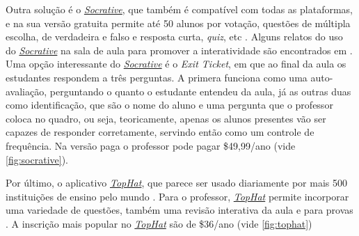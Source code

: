 Outra solução é o \href{http://www.socrative.com/}{\textit{Socrative}},
que também é compatível com todas as plataformas, e na sua versão gratuita
permite até 50 alunos por votação, questões de múltipla escolha, de verdadeira e falso e
resposta curta, \textit{quiz}, etc \cite{socrative2016}. Alguns relatos do uso do
\href{http://www.socrative.com/}{\textit{Socrative}} na sala de aula para promover
a interatividade são encontrados em \cite{Kaya2016, Trindade2014}.
Uma opção interessante do \href{http://www.socrative.com/}{\textit{Socrative}}
é o \textit{Exit Ticket}, em que ao final da aula os estudantes respondem
a três perguntas. A primera funciona como uma auto-avaliação, perguntando
o quanto o estudante entendeu da aula, já as outras duas como identificação, que são o
nome do aluno e uma pergunta que o professor coloca no quadro, ou seja, teoricamente,
apenas os alunos presentes vão ser capazes de responder corretamente, servindo
então como um controle de frequência. Na versão paga o professor pode pagar \$49,99/ano (vide \autoref{fig:socrative}).

Por último, o aplicativo \href{http://www.tophat.com/}{\textit{TopHat}}, que parece
ser usado diariamente por mais 500 instituições de ensino pelo mundo \cite{tophat2016}.
Para o professor, \href{http://www.tophat.com/}{\textit{TopHat}} permite incorporar
uma variedade de questões, também uma revisão interativa da aula e para provas
\cite{Neilson2016}. A inscrição mais popular no  \href{http://www.tophat.com/}{\textit{TopHat}}
são de \$36/ano (vide \autoref{fig:tophat})

